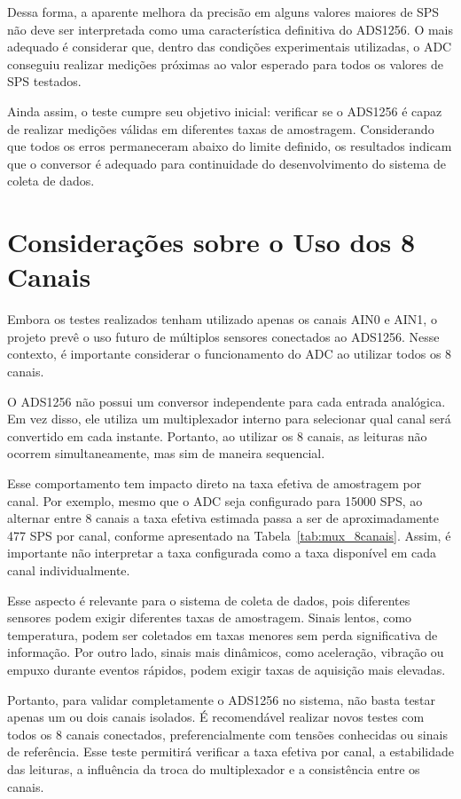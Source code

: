 \documentclass[12pt, a4paper]{article}
\begin{document}
Dessa forma, a aparente melhora da precisão em alguns valores maiores de SPS não deve ser interpretada como uma característica definitiva do ADS1256. 
O mais adequado é considerar que, dentro das condições experimentais utilizadas, o ADC conseguiu realizar medições próximas ao valor esperado para todos os valores de SPS testados. 

Ainda assim, o teste cumpre seu objetivo inicial: verificar se o ADS1256 é capaz de realizar medições válidas em diferentes taxas de amostragem. 
Considerando que todos os erros permaneceram abaixo do limite definido, 
os resultados indicam que o conversor é adequado para continuidade do desenvolvimento do sistema de coleta de dados.

\section{Considerações sobre o Uso dos 8 Canais}

Embora os testes realizados tenham utilizado apenas os canais AIN0 e AIN1, 
o projeto prevê o uso futuro de múltiplos sensores conectados ao ADS1256. 
Nesse contexto, é importante considerar o funcionamento do ADC ao utilizar todos os 8 canais.

O ADS1256 não possui um conversor independente para cada entrada analógica. 
Em vez disso, ele utiliza um multiplexador interno para selecionar qual canal será convertido em cada instante. 
Portanto, ao utilizar os 8 canais, as leituras não ocorrem simultaneamente, mas sim de maneira sequencial.

Esse comportamento tem impacto direto na taxa efetiva de amostragem por canal. 
Por exemplo, mesmo que o ADC seja configurado para 15000 SPS, ao alternar entre 8 canais a taxa efetiva estimada passa a ser de aproximadamente 477 SPS por canal, 
conforme apresentado na Tabela~\ref{tab:mux_8canais}. Assim, é importante não interpretar a taxa configurada como a taxa disponível em cada canal individualmente.

Esse aspecto é relevante para o sistema de coleta de dados, 
pois diferentes sensores podem exigir diferentes taxas de amostragem. 
Sinais lentos, como temperatura, podem ser coletados em taxas menores sem perda significativa de informação. 
Por outro lado, sinais mais dinâmicos, como aceleração, vibração ou empuxo durante eventos rápidos, podem exigir taxas de aquisição mais elevadas.

Portanto, para validar completamente o ADS1256 no sistema, não basta testar apenas um ou dois canais isolados. 
É recomendável realizar novos testes com todos os 8 canais conectados, preferencialmente com tensões conhecidas ou sinais de referência. 
Esse teste permitirá verificar a taxa efetiva por canal, a estabilidade das leituras, a influência da troca do multiplexador e a consistência entre os canais.
\end{document}
